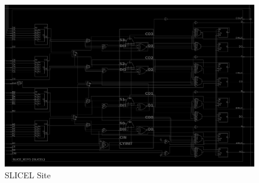\documentclass{article}
\begin{document}
\begin{multicols}{2}
    \begin{figure}[t]
        \centering
        \includegraphics[width=\textwidth]{figures/slicel.png}
        \caption{SLICEL Site}
        \label{fig:slicel}
    \end{figure}

\end{multicols}
\end{document}
